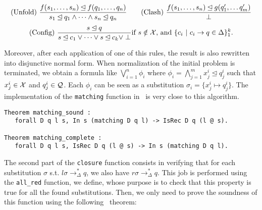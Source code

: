 \[\textrm{(Unfold) }
\dfrac {
  f(s_1, \dots, s_n)\unlhd f(q_1,\dots, q_n)
}{
  s_1 \unlhd q_1 \land \dots \land s_n \unlhd q_n
}\quad \quad
\textrm{(Clash) }
\dfrac {
  f(s_1, \dots, s_n) \unlhd g(q'_1, \dots q'_m)
}{
\perp}
\]
\[\textrm{(Config) }
\dfrac {
  s \unlhd q
}{
  s \unlhd c_1 \lor \dots \lor s \unlhd c_k \lor \perp
}
\textrm{if }s \notin {\cal X} \textrm{, and } \{c_i\ |\ c_i \rightarrow q \in \Delta\}_1^k. 
\]

Moreover, after each application of one of this rules,
the result is also rewritten into disjunctive normal form.
When normalization of the initial problem is terminated, we obtain a
formula like $ \bigvee_{i=1}^{n} \phi_i$ where
$\phi_i=\bigwedge_{j=1}^{m}x^i_j \unlhd q^i_j$ such that $x^i_j \in
{\cal X}$ and $q^i_j \in \mathcal{Q}$. Each $\phi_i$ can be seen as a
substitution $\sigma_i = \{x^i_j \mapsto q^i_j\}$.
The implementation of the \lstinline!matching! function in \coq\ is very close
to this algorithm. 
\begin{lstlisting}
Theorem matching_sound :
   forall D q l s, In s (matching D q l) -> IsRec D q (l @ s).

Theorem matching_complete :
   forall D q l s, IsRec D q (l @ s) -> In s (matching D q l).
\end{lstlisting}

The second part of the \lstinline!closure! function consists in verifying that
for each substitution $\sigma$ s.t. $l\sigma \rightarrow_\Delta^* q$, we also
have $r\sigma \rightarrow_\Delta^* q$.  This job is performed using the
\lstinline!all_red! function, we define, whose purpose is to check that this
property is true for all the found substitutions. Then, we only need to prove
the soundness of this function using the following \coq\ theorem:

